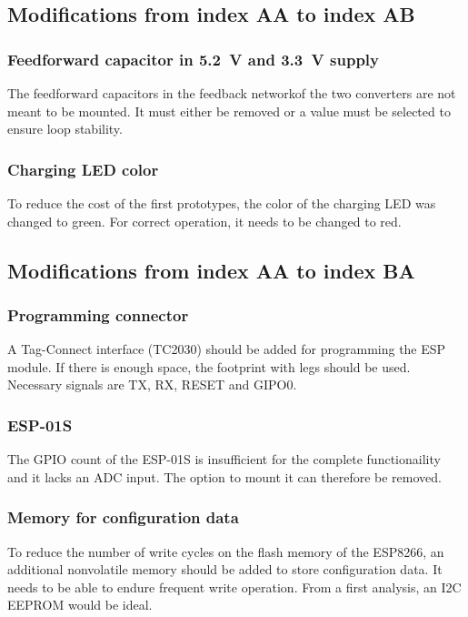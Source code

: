 \FloatBarrier

\subsection{Modifications from index AA to index AB}

\subsubsection{Feedforward capacitor in \SI{5.2}{\volt} and \SI{3.3}{\volt} supply}
The feedforward capacitors in the feedback networkof the two converters are not meant to be mounted. It must either be removed or a value must be selected to ensure loop stability. 

\subsubsection{Charging LED color}
To reduce the cost of the first prototypes, the color of the charging \ac{LED} was changed to green. For correct operation, it needs to be changed to red. 

\subsection{Modifications from index AA to index BA}

\subsubsection{Programming connector}
A Tag-Connect interface (TC2030) should be added for programming the ESP module. If there is enough space, the footprint with legs should be used. Necessary signals are TX, RX, RESET and GIPO0. 

\subsubsection{ESP-01S}
The GPIO count of the ESP-01S is insufficient for the complete functionaility and it lacks an \ac{ADC} input. The option to mount it can therefore be removed. 

\subsubsection{Memory for configuration data}
To reduce the number of write cycles on the flash memory of the ESP8266, an additional nonvolatile memory should be added to store configuration data. It needs to be able to endure frequent write operation. From a first analysis, an \ac{I2C} \ac{EEPROM} would be ideal. 

